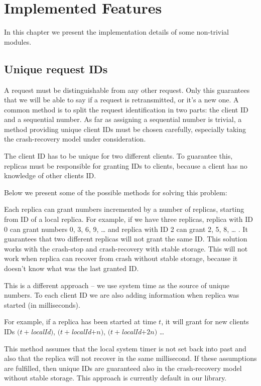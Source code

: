 \chapter{Implemented Features}

In this chapter we present the implementation details of some non-trivial modules.

\section{Unique request IDs}

A request must be distinguishable from any other request. Only this guarantees that we will be able to say if a request is retransmitted, or it's a new one. A common method is to split the request identification in two parts: the client ID and a sequential number. As far as assigning a sequential number is trivial, a method providing unique client IDs must be chosen carefully, especially taking the crash-recovery model under consideration.

The client ID has to be unique for two different clients. To guarantee this, replicas must be responsible for granting IDs to clients, because a client has no knowledge of other clients ID.

Below we present some of the possible methods for solving this problem:

Each replica can grant numbers %
incremented by a number of replicas, starting from ID of a local replica. For example, if we have three replicas, replica with ID 0 can grant numbers 0, 3, 6, 9, \ldots{} and replica with ID 2 can grant 2, 5, 8, \ldots{} . It guarantees that two different replicas will not grant the same ID. This solution works with the crash-stop and crash-recovery with stable storage. This will not work when replica can recover from crash without stable storage, because it doesn't know what was the last granted ID.

This is a different approach -- we use system time as the source of unique numbers. To each client ID we are also adding information when replica was started (in milliseconds).

For example, if a replica has been started at time $t$, it will grant for new clients IDs $(t + $\textit{localId}$)$, $(t + $\textit{localId}$ + n)$, $(t + $\textit{localId}$ + 2n)$ \ldots

This method assumes that the local system timer is not set back into past and also that the replica will not recover in the same millisecond. If these assumptions are fulfilled, then unique IDs are guaranteed also in the crash-recovery model without stable storage. This approach is currently default in our library.

